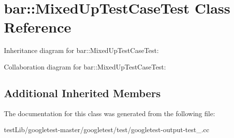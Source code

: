 \hypertarget{classbar_1_1MixedUpTestCaseTest}{}\section{bar\+:\+:Mixed\+Up\+Test\+Case\+Test Class Reference}
\label{classbar_1_1MixedUpTestCaseTest}


Inheritance diagram for bar\+:\+:Mixed\+Up\+Test\+Case\+Test\+:


Collaboration diagram for bar\+:\+:Mixed\+Up\+Test\+Case\+Test\+:
\subsection*{Additional Inherited Members}


The documentation for this class was generated from the following file\+:\begin{DoxyCompactItemize}
\item 
test\+Lib/googletest-\/master/googletest/test/googletest-\/output-\/test\+\_\+.\+cc\end{DoxyCompactItemize}
